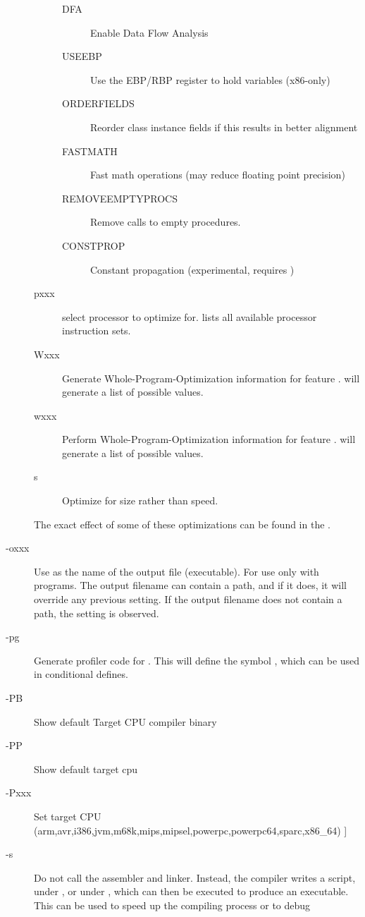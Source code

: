 \begin{description}
\begin{description}
\begin{description}
\item[DFA] Enable Data Flow Analysis
\item[USEEBP] Use the EBP/RBP register to hold variables (x86-only)
\item[ORDERFIELDS] Reorder class instance fields if this results in better alignment
\item[FASTMATH] Fast math operations (may reduce floating point precision)
\item[REMOVEEMPTYPROCS] Remove calls to empty procedures.
\item[CONSTPROP] Constant propagation (experimental, requires )
\end{description}
\item[pxxx] select processor  to optimize for.  lists
all available processor instruction sets.
\item[Wxxx] Generate Whole-Program-Optimization information for feature .
 will generate a list of possible values.
\item[wxxx] Perform  Whole-Program-Optimization information for feature
.  will generate a list of possible values.
\item[s] Optimize for size rather than speed.
\end{description}
The exact effect of some of these optimizations can be found in the \progref.
\item [-oxxx]  Use  as the name of the output
file (executable). For use only with programs. The output filename can contain a
path, and if it does, it will override any previous  setting. If
the output filename does not contain a path, the  setting is
observed.
\item [-pg]  Generate profiler code for . This will
define the symbol , which can be used in conditional
defines.
\item[-PB]        Show default Target CPU compiler binary
\item[-PP]        Show default target cpu
\item[-Pxxx]      Set target CPU (arm,avr,i386,jvm,m68k,mips,mipsel,powerpc,powerpc64,sparc,x86\_64)
]
\item [-s]  Do not call the assembler and linker.
Instead, the compiler writes a script,  under \dos, or
 under \linux, which can then be executed to produce an
executable. This can be used to speed up the compiling process or to debug

\end{description}
